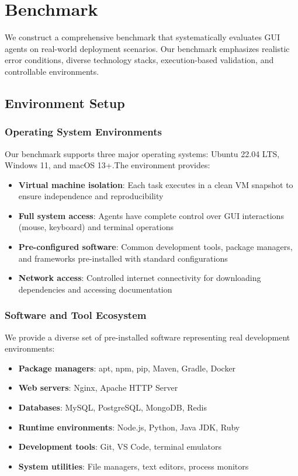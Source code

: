 \section{Benchmark}\label{sec:benchmark}

We construct a comprehensive benchmark that systematically evaluates GUI agents on real-world deployment scenarios. Our benchmark emphasizes realistic error conditions, diverse technology stacks, execution-based validation, and controllable environments.

\subsection{Environment Setup}\label{sec:environment}

\subsubsection{Operating System Environments}

Our benchmark supports three major operating systems: Ubuntu 22.04 LTS, Windows 11, and macOS 13+.The environment provides:

\begin{itemize}
\item \textbf{Virtual machine isolation}: Each task executes in a clean VM snapshot to ensure independence and reproducibility
\item \textbf{Full system access}: Agents have complete control over GUI interactions (mouse, keyboard) and terminal operations
\item \textbf{Pre-configured software}: Common development tools, package managers, and frameworks pre-installed with standard configurations
\item \textbf{Network access}: Controlled internet connectivity for downloading dependencies and accessing documentation
\end{itemize}

\subsubsection{Software and Tool Ecosystem}

We provide a diverse set of pre-installed software representing real development environments:

\begin{itemize}
\item \textbf{Package managers}: apt, npm, pip, Maven, Gradle, Docker
\item \textbf{Web servers}: Nginx, Apache HTTP Server
\item \textbf{Databases}: MySQL, PostgreSQL, MongoDB, Redis
\item \textbf{Runtime environments}: Node.js, Python, Java JDK, Ruby
\item \textbf{Development tools}: Git, VS Code, terminal emulators
\item \textbf{System utilities}: File managers, text editors, process monitors
\end{itemize}

